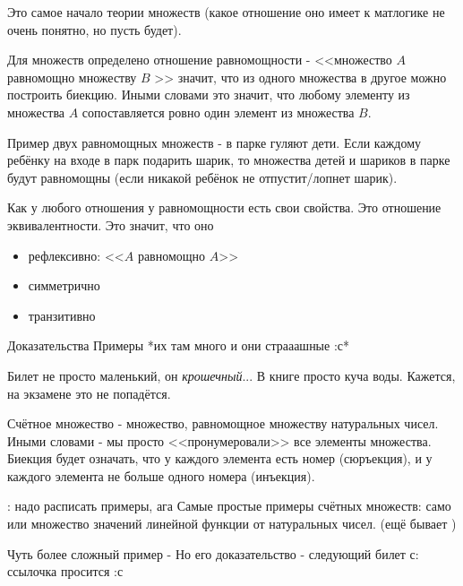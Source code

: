 
Это самое начало теории множеств (какое отношение оно имеет к матлогике не очень понятно, но  пусть будет).


Для множеств определено отношение равномощности 
	- <<множество $A$ равномощно множеству $B$ >> значит, что из одного множества в другое можно построить биекцию.
Иными словами это значит, что любому элементу из множества $A$ сопоставляется ровно один элемент из множества $B$.

Пример двух равномощных множеств 
	- в парке гуляют дети. Если каждому ребёнку на входе в парк подарить шарик, то множества детей и шариков в парке будут равномощны (если никакой ребёнок не отпустит/лопнет шарик).
	
Как у любого отношения у равномощности есть свои свойства.
Это отношение эквивалентности.
Это значит, что оно \begin{itemize}
		    	\item
		    		рефлексивно: <<$A$ равномощно $A$>>
		    	\item
		    		симметрично
		    	\item
		    		транзитивно 
		    \end{itemize}
		    \TODO Доказательства
\TODO Примеры *их там много и они страаашные :с*


Билет не просто маленький, он \textit{крошечный}... В книге просто куча воды. Кажется, на экзамене это не попадётся. \newline \newline

Счётное множество - множество, равномощное множеству натуральных чисел.
Иными словами - мы просто <<пронумеровали>> все элементы множества.
Биекция будет означать, что у каждого элемента есть номер (сюръекция), и у каждого элемента не больше одного номера (инъекция).

\TODO: надо расписать примеры, ага
Самые простые примеры счётных множеств: само \N или множество значений линейной функции от натуральных чисел. (ещё бывает \Z)

Чуть более сложный пример - \Q \newline
Но его доказательство - следующий билет с: 
\TODO ссылочка просится :с


